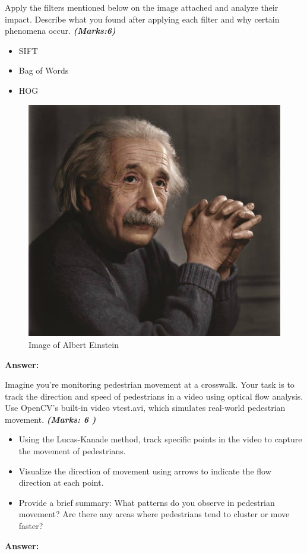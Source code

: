 \documentclass[12pt, a4paper]{exam}
\begin{document}
\vspace{0.2in}
\begin{questions}
	\pointsdroppedatright
	\question

Apply the filters mentioned below on the image attached and analyze their impact.
Describe what you found after applying each filter and why certain phenomena
occur. \textbf{\textit{(Marks:6)}}
\begin{itemize}
    \item SIFT
    \item Bag of Words
    \item HOG
\end{itemize}

\begin{figure}[H]
    \centering
    \includegraphics[width=.3\textwidth]{res/Albert_Einstein.jpg}
    \caption{Image of Albert Einstein}
    \label{fig:1q}
\end{figure}

\vspace{0.2in}
	\pointsdroppedatright 
\textbf{Answer:}



\newpage
\question

Imagine you’re monitoring pedestrian movement at a crosswalk. Your task is to track the direction and speed of pedestrians in a video using optical flow analysis. Use OpenCV’s built-in video vtest.avi, which simulates real-world pedestrian movement. \textbf{\textit{(Marks: 6 )}}

\begin{itemize}
    \item Using the Lucas-Kanade method, track specific points in the video to capture the movement of pedestrians.
    \item Visualize the direction of movement using arrows to indicate the flow direction at each point.
    \item Provide a brief summary: What patterns do you observe in pedestrian movement? Are there any areas where pedestrians tend to cluster or move faster?
\end{itemize}
\vspace{0.2in}
	\pointsdroppedatright 
\textbf{Answer:}



\end{questions}
\end{document}
